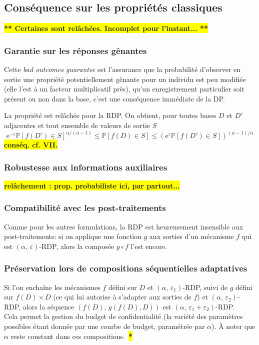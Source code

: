 \documentclass[a4paper,11pt]{article} %
\newcommand{\rem}[1]{\colorbox{yellow}{\textbf{#1}}}
\newcommand{\REM}[1]{\colorbox{yellow}{\color{red}\textbf{#1}}}
\begin{document}
\subsection{Conséquence sur les propriétés classiques}
%
\rem{** Certaines sont relâchées. Incomplet pour l'instant... **}%

\subsubsection{Garantie sur les \og réponses gênantes\fg{}}
Cette \emph{\og{}bad outcomes\fg{} guarantee} est l'assurance que la probabilité d'observer en sortie une propriété potentiellement gênante pour un individu est peu modifiée (elle l'est à un facteur multiplicatif près), qu'un enregistrement particulier soit présent ou non dans la base, c'est une conséquence immédiate de la DP.

La propriété est relâchée pour la RDP. On obtient, pour toutes bases $D$ et $D'$ adjacentes et tout ensemble de valeurs de sortie $S$
\[ \text{e}^{-\varepsilon} \mathbb{P}[f(D')\in S]^{\alpha/(\alpha-1)}
   \leqslant \mathbb{P}[f(D)\in S] \leqslant
   \left(\text{e}^{\varepsilon} \mathbb{P}[f(D')\in S]\right)^{(\alpha-1)/\alpha} \]
   \rem{conséq. cf. VII.}%
\subsubsection{Robustesse aux informations auxiliaires}
\rem{relâchement : prop. probabiliste ici, par partout...}%
\subsubsection{Compatibilité avec les post-traitements}
Comme pour les autres formulations, la RDP est heureusement insensible aux post-traitements: si on applique une fonction $g$ aux sorties d'un mécanisme $f$ qui est $(\alpha,\,\varepsilon)$-RDP, alors la composée $g\circ f$ l'est encore.
\subsubsection{Préservation lors de compositions séquentielles adaptatives}
Si l'on enchaîne les mécanismes $f$ défini sur $D$ et  $(\alpha,\,\varepsilon_1)$-RDP, suivi de $g$ défini sur $f(D)\times D$ (ce qui lui autorise à s'adapter aux sorties de $f$) et $(\alpha,\,\varepsilon_2)$-RDP, alors la séquence $(f(D),\, g(f(D),D))$ est $(\alpha,\,\varepsilon_1 + \varepsilon_2)$-RDP.\\
Cela permet la gestion du budget de confidentialité (la variété des paramètres possibles étant donnée par une \og courbe de budget\fg{}, paramétrée par $\alpha$). À noter que $\alpha$ reste constant dans ces compositions.~\REM{*}%
\end{document}
